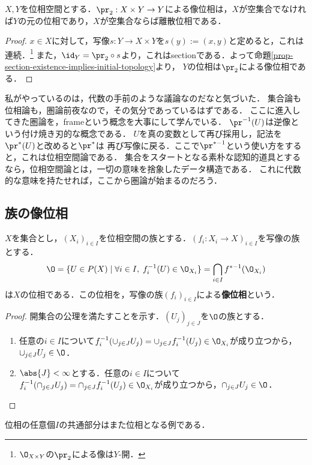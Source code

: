 \documentclass[uplatex,dvipdfmx]{jsreport}
\begin{document}
\begin{corollary}
    $X,Y$を位相空間とする．$\pr_2:X\times Y\to Y$による像位相は，$X$が空集合でなければ$Y$の元の位相であり，$X$が空集合ならば離散位相である．
\end{corollary}
\begin{proof}
    $x\in X$に対して，写像$s:Y\to X\times Y$を$s(y):=(x,y)$と定めると，これは連続．\footnote{$\O_{X\times Y}$の$\pr_2$による像は$Y$-開．}
    また，$\id_Y=\pr_2\circ s$より，これはsectionである．よって命題\ref{prop-section-existence-implies-initial-topology}より，
    $Y$の位相は$\pr_2$による像位相である．
\end{proof}
\begin{remarks}
    私がやっているのは，代数の手前のような議論なのだなと気づいた．
    集合論も位相論も，圏論前夜なので，その気分であっているはずである．
    ここに進入してきた圏論を，frameという概念を大事にして学んでいる．
    $\pr^{-1}(U)$は逆像という付け焼き刃的な概念である．
    $U$を真の変数として再び採用し，記法を$\pr^*(U)$と改めると$\pr^*$は
    再び写像に戻る．ここで$\pr^{*-1}$という使い方をすると，これは位相空間論である．
    集合をスタートとなる素朴な認知的道具とするなら，位相空間論とは，一切の意味を捨象したデータ構造である．
    これに代数的な意味を持たせれば，ここから圏論が始まるのだろう．
\end{remarks}

\subsection{族の像位相}

\begin{proposition}[像位相の特徴付け]
    $X$を集合とし，$(X_i)_{i\in I}$を位相空間の族とする．$(f_i:X_i\to X)_{i\in I}$を写像の族とする．
    \[ \O=\{U\in P(X)\mid \forall i\in I,\; f^{-1}_i(U)\in\O_{X_i}\}=\bigcap_{i\in I}f^{*-1}(\O_{X_i}) \]
    は$X$の位相である．この位相を，写像の族$(f_i)_{i\in I}$による\textbf{像位相}という．
\end{proposition}
\begin{proof}
    開集合の公理を満たすことを示す．$(U_j)_{j\in J}$を$\O$の族とする．
    \begin{enumerate}
        \item 任意の$i\in I$について$f^{-1}_i(\cup_{j\in J}U_j)=\cup_{j\in J}f^{-1}_i(U_j)\in\O_{X_i}$が成り立つから，$\cup_{j\in J}U_j\in\O$．
        \item $\abs{J}<\infty$とする．任意の$i\in I$について$f^{-1}_i(\cap_{j\in J}U_j)=\cap_{j\in J}f^{-1}_i(U_j)\in\O_{X_i}$が成り立つから，$\cap_{j\in J}U_j\in\O$．
    \end{enumerate}
\end{proof}
\begin{remarks}
    位相の任意個$I$の共通部分はまた位相となる例である．
\end{remarks}
\end{document}
